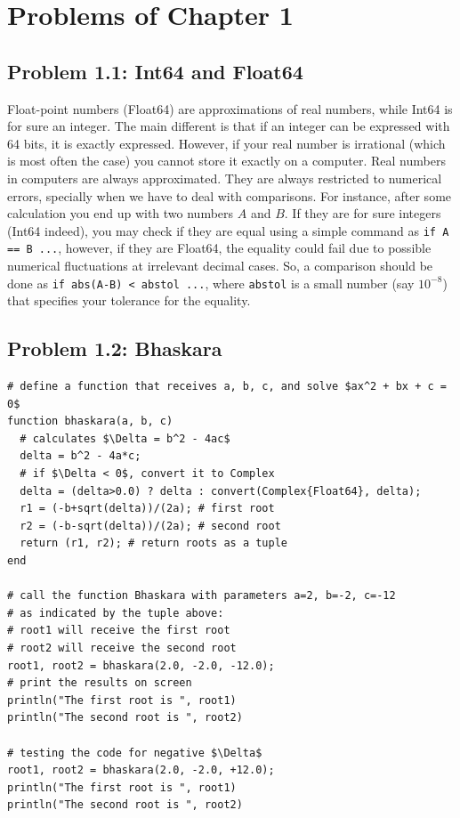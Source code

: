 \section{Problems of Chapter 1}

\subsection*{Problem 1.1: Int64 and Float64}

Float-point numbers (Float64) are approximations of real numbers, while Int64 is for sure an integer. The main different is that if an integer can be expressed with 64 bits, it is exactly expressed. However, if your real number is irrational (which is most often the case) you cannot store it exactly on a computer. Real numbers in computers are always approximated. They are always restricted to numerical errors, specially when we have to deal with comparisons. For instance, after some calculation you end up with two numbers $A$ and $B$. If they are for sure integers (Int64 indeed), you may check if they are equal using a simple command as \texttt{if A == B ...}, however, if they are Float64, the equality could fail due to possible numerical fluctuations at irrelevant decimal cases. So, a comparison should be done as \texttt{if abs(A-B) < abstol ...}, where \texttt{abstol} is a small number (say $10^{-8}$) that specifies your tolerance for the equality.


\subsection*{Problem 1.2: Bhaskara}

\begin{verbatim}
# define a function that receives a, b, c, and solve $ax^2 + bx + c = 0$
function bhaskara(a, b, c)
  # calculates $\Delta = b^2 - 4ac$
  delta = b^2 - 4a*c;
  # if $\Delta < 0$, convert it to Complex
  delta = (delta>0.0) ? delta : convert(Complex{Float64}, delta);
  r1 = (-b+sqrt(delta))/(2a); # first root
  r2 = (-b-sqrt(delta))/(2a); # second root
  return (r1, r2); # return roots as a tuple
end

# call the function Bhaskara with parameters a=2, b=-2, c=-12
# as indicated by the tuple above:
# root1 will receive the first root
# root2 will receive the second root
root1, root2 = bhaskara(2.0, -2.0, -12.0);
# print the results on screen
println("The first root is ", root1)
println("The second root is ", root2)

# testing the code for negative $\Delta$
root1, root2 = bhaskara(2.0, -2.0, +12.0);
println("The first root is ", root1)
println("The second root is ", root2)
\end{verbatim}

